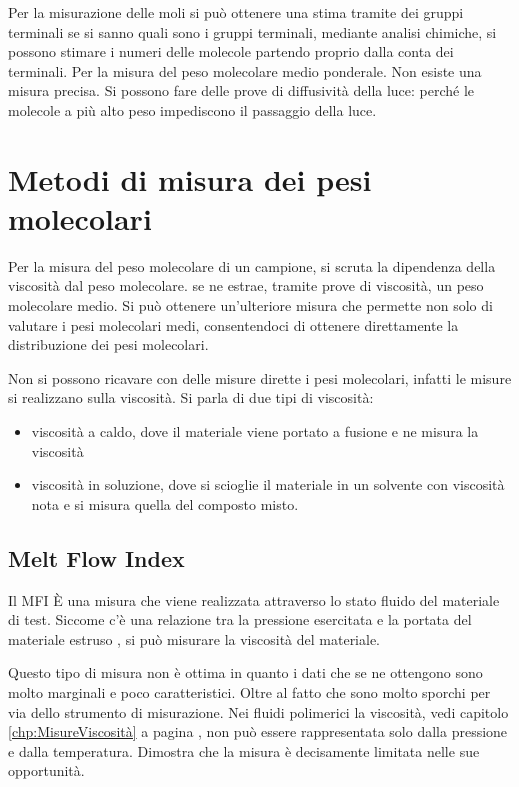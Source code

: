 Per la misurazione delle moli si può ottenere una stima tramite dei gruppi terminali se si sanno quali sono i gruppi terminali, mediante analisi chimiche, si possono stimare i numeri delle molecole partendo proprio dalla conta dei terminali.
Per la misura del peso molecolare medio ponderale. Non esiste una misura precisa. Si possono fare delle prove di diffusività della luce: perché le molecole a più alto peso impediscono il passaggio della luce.

\chapter{Metodi di misura dei pesi molecolari}\label{chp:MisuraPM}
Per la misura del peso molecolare di un campione, si scruta la dipendenza della viscosità dal peso molecolare. 
se ne estrae, tramite prove di viscosità, un peso molecolare medio. 
Si può ottenere un'ulteriore misura che permette non solo di valutare i pesi molecolari medi, consentendoci di ottenere direttamente la distribuzione dei pesi molecolari.

Non si possono ricavare con delle misure dirette i pesi molecolari, infatti le misure si realizzano sulla viscosità. 
Si parla di due tipi di viscosità: 
\begin{itemize}
\item viscosità a caldo, dove il materiale viene portato a fusione e ne misura la viscosità
\item viscosità in soluzione, dove si scioglie il materiale in un solvente con viscosità nota e si misura quella del composto misto.
\end{itemize}

\section{Melt Flow Index}
Il \ac{MFI} È una misura che viene realizzata attraverso lo stato fluido del materiale di test. Siccome c'è una relazione tra la pressione esercitata e la portata del materiale estruso , si può misurare la viscosità del materiale.

Questo tipo di misura non è ottima in quanto i dati che se ne ottengono sono molto marginali e poco caratteristici. Oltre al fatto che sono molto sporchi per via dello strumento di misurazione.
Nei fluidi polimerici la viscosità, vedi capitolo \ref{chp:MisureViscosità} a pagina \pageref{chp:MisureViscosità}, non può essere rappresentata solo dalla pressione e dalla temperatura. Dimostra che la misura è decisamente limitata nelle sue opportunità.

